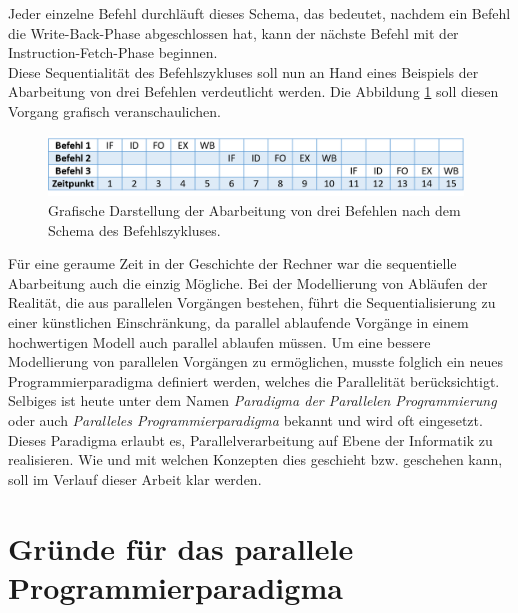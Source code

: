 \begin{description}
						Jeder einzelne Befehl durchläuft dieses Schema, das bedeutet, nachdem ein Befehl die Write-Back-Phase abgeschlossen hat, kann der nächste Befehl mit der Instruction-Fetch-Phase beginnen. \cite{PhasenBefehlsbearbeitung} \cite{FunktionsweiseComputersysteme}\\
						
						Diese Sequentialität des Befehlszykluses soll nun an Hand eines Beispiels der Abarbeitung von drei Befehlen verdeutlicht werden.
						Die Abbildung \ref{fig:BefehlszylusOhnePipelining} soll diesen Vorgang grafisch veranschaulichen.
						
						\begin{figure}
							\centering	
							\includegraphics[width=11cm]{Abbildungen/Befehlszylus_ohne_Pipelining.png}
							\caption{Grafische Darstellung der Abarbeitung von drei Befehlen nach dem Schema des Befehlszykluses.}
							\label{fig:BefehlszylusOhnePipelining}
						\end{figure}
				\end{description}
			
				Für eine geraume Zeit in der Geschichte der Rechner war die sequentielle Abarbeitung auch die einzig Mögliche. Bei der Modellierung von Abläufen der Realität, die aus parallelen Vorgängen bestehen, führt die Sequentialisierung zu einer künstlichen Einschränkung, da parallel ablaufende Vorgänge in einem hochwertigen Modell auch parallel ablaufen müssen.
				Um eine bessere Modellierung von parallelen Vorgängen zu ermöglichen, musste folglich ein neues Programmierparadigma definiert werden, welches die Parallelität berücksichtigt. Selbiges ist heute unter dem Namen \textit{Paradigma der Parallelen Programmierung} oder auch \textit{Paralleles Programmierparadigma} bekannt und wird oft eingesetzt. Dieses Paradigma erlaubt es, Parallelverarbeitung auf Ebene der Informatik zu realisieren. Wie und mit welchen Konzepten dies geschieht bzw. geschehen kann, soll im Verlauf dieser Arbeit klar werden.
				
	\section{Gründe für das parallele Programmierparadigma}
				
